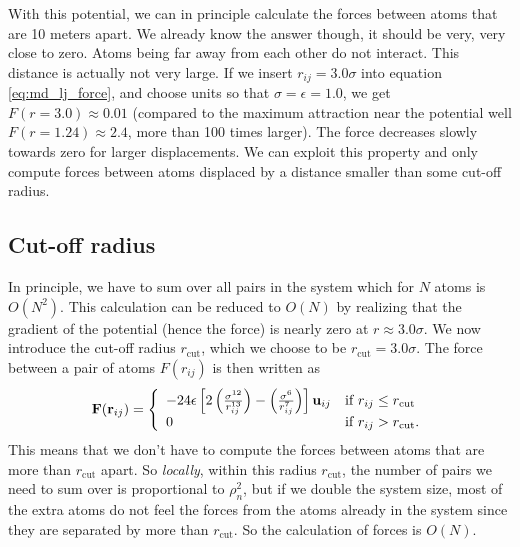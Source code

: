 With this potential, we can in principle calculate the forces between atoms that are 10 meters apart. We already know the answer though, it should be very, very close to zero. Atoms being far away from each other do not interact. This distance is actually not very large. If we insert $r_{ij} = 3.0\sigma$ into equation \eqref{eq:md_lj_force}, and choose units so that $\sigma = \epsilon = 1.0$, we get $F(r=3.0) \approx 0.01$ (compared to the maximum attraction near the potential well $F(r = 1.24) \approx 2.4$, more than 100 times larger). The force decreases slowly towards zero for larger displacements. We can exploit this property and only compute forces between atoms displaced by a distance smaller than some cut-off radius.
\subsection{Cut-off radius}
\label{sec:md_implementation_two_body_forces}
In principle, we have to sum over all pairs in the system which for $N$ atoms is $O(N^2)$. This calculation can be reduced to $O(N)$ by realizing that the gradient of the potential (hence the force) is nearly zero at $r \approx 3.0\sigma$. We now introduce the cut-off radius $r_\text{cut}$, which we choose to be $r_\text{cut} = 3.0\sigma$. The force between a pair of atoms $F(r_{ij})$ is then written as
\begin{align}
	\vec F(\vec r_{ij}) = \left\{
	\begin{array}{l l}
		-24\epsilon\left[2\left(\frac{\sigma^{12}}{r_{ij}^{13}}\right) - \left(\frac{\sigma^6}{r_{ij}^7}\right)\right]\vec u_{ij} & \text{if } r_{ij} \leq r_\text{cut}\\
		0 & \text{if } r_{ij} > r_\text{cut}.
	\end{array}\right .
\end{align}
This means that we don't have to compute the forces between atoms that are more than $r_\text{cut}$ apart. So \textit{locally}, within this radius $r_\text{cut}$, the number of pairs we need to sum over is proportional to $\rho_n^2$, but if we double the system size, most of the extra atoms do not feel the forces from the atoms already in the system since they are separated by more than $r_\text{cut}$. So the calculation of forces is $O(N)$.